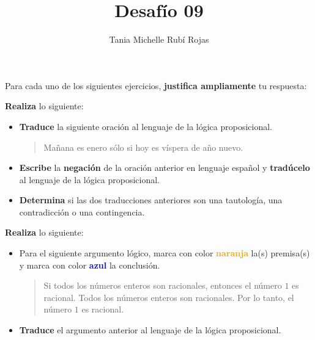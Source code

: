 \documentclass[oneside]{style}
\title{Desafío 09}
\author{Tania Michelle Rubí Rojas}
\begin{document}
\maketitle

Para cada uno de los siguientes ejercicios, \textbf{justifica ampliamente} tu 
respuesta:

\begin{questions}[label=\protect\circled{\bfseries\arabic*}]
    \question
    {
        \textbf{Realiza} lo siguiente:
        \begin{itemize}
            \item \textbf{Traduce} la siguiente oración al lenguaje de la 
            lógica proposicional. 

            \begin{quote}
                \centering
                Mañana es enero sólo si hoy es víspera de año nuevo. 
            \end{quote}

            \item \textbf{Escribe} la \textbf{negación} de la oración anterior 
            en lenguaje español y \textbf{tradúcelo} al lenguaje de la lógica 
            proposicional.

            \item \textbf{Determina} si las dos traducciones anteriores son 
            una tautología, una contradicción o una contingencia. 
        \end{itemize}
    }

    \question
    {

        \textbf{Realiza} lo siguiente:
        \begin{itemize}
            \item Para el siguiente argumento lógico, marca con color 
            \textcolor{orange}{\textbf{naranja}} la(s) premisa(s) y marca con 
            color \textcolor{blue}{\textbf{azul}} la conclusión.

            \begin{quote}
                \centering
                Si todos los números enteros son racionales, entonces 
                el número $1$ es racional. Todos los números enteros son 
                racionales. Por lo tanto, el número $1$ es racional.
            \end{quote}
    
            \item \textbf{Traduce} el argumento anterior al lenguaje de la lógica 
            proposicional.
    

\end{itemize}}
\end{questions}
\end{document}
